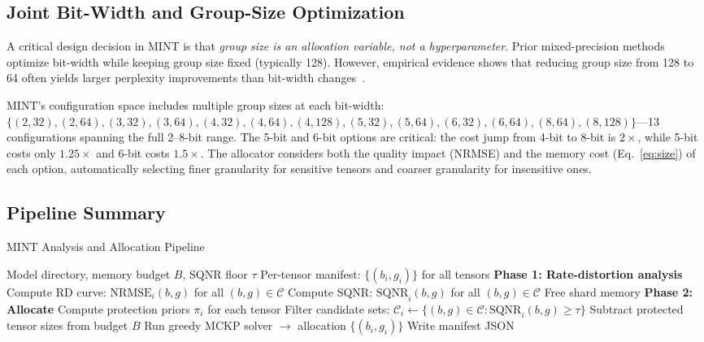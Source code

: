 \documentclass{article}
\begin{document}
\subsection{Joint Bit-Width and Group-Size Optimization}

A critical design decision in MINT is that \emph{group size is an allocation variable, not a hyperparameter}. Prior mixed-precision methods optimize bit-width while keeping group size fixed (typically 128). However, empirical evidence shows that reducing group size from 128 to 64 often yields larger perplexity improvements than bit-width changes~\cite{li2025mixllm}.

MINT's configuration space includes multiple group sizes at each bit-width: $\{(2,32), (2,64), (3,32), (3,64), (4,32), (4,64), (4,128), (5,32), (5,64), (6,32), (6,64), (8,64), (8,128)\}$---13 configurations spanning the full 2--8-bit range. The 5-bit and 6-bit options are critical: the cost jump from 4-bit to 8-bit is $2\times$, while 5-bit costs only $1.25\times$ and 6-bit costs $1.5\times$. The allocator considers both the quality impact (NRMSE) and the memory cost (Eq.~\ref{eq:size}) of each option, automatically selecting finer granularity for sensitive tensors and coarser granularity for insensitive ones.

\subsection{Pipeline Summary}

\begin{algorithm}[t]
\caption{MINT Analysis and Allocation Pipeline}
\label{alg:pipeline}
\begin{algorithmic}[1]
\REQUIRE Model directory, memory budget $B$, SQNR floor $\tau$
\ENSURE Per-tensor manifest: $\{(b_i, g_i)\}$ for all tensors
\STATE \textbf{Phase 1: Rate-distortion analysis}
        \STATE Compute RD curve: $\text{NRMSE}_i(b,g)$ for all $(b,g) \in \mathcal{C}$
        \STATE Compute SQNR: $\text{SQNR}_i(b,g)$ for all $(b,g) \in \mathcal{C}$
    \ENDFOR
    \STATE Free shard memory
\ENDFOR
\STATE \textbf{Phase 2: Allocate}
\STATE Compute protection priors $\pi_i$ for each tensor
\STATE Filter candidate sets: $\mathcal{C}_i \leftarrow \{(b,g) \in \mathcal{C} : \text{SQNR}_i(b,g) \geq \tau\}$
\STATE Subtract protected tensor sizes from budget $B$
\STATE Run greedy MCKP solver $\rightarrow$ allocation $\{(b_i, g_i)\}$
\STATE Write manifest JSON
\end{algorithmic}
\end{algorithm}
\end{document}
